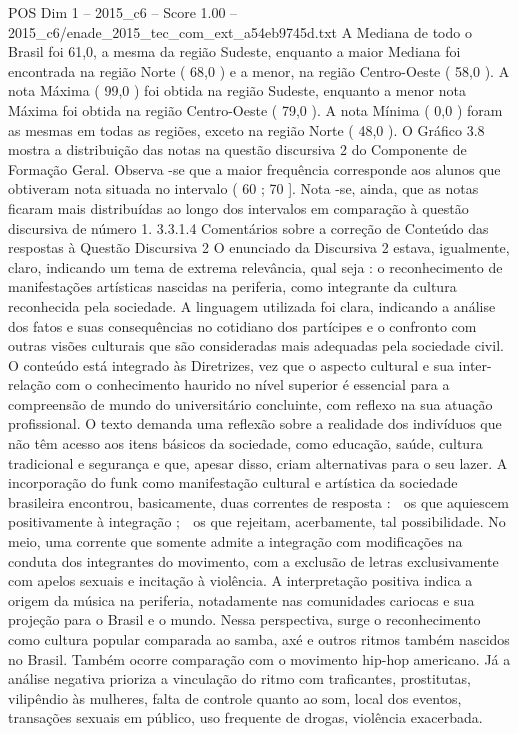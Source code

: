 \begin{textsample}{POS Dim 1 – 2015\_c6 – Score 1.00 – 2015\_c6/enade\_2015\_tec\_com\_ext\_a54eb9745d.txt}
A Mediana de todo o Brasil foi 61,0, a mesma da região Sudeste, enquanto a maior Mediana foi encontrada na região Norte ( 68,0 ) e a menor, na região Centro-Oeste ( 58,0 ).
A nota Máxima ( 99,0 ) foi obtida na região Sudeste, enquanto a menor nota Máxima foi obtida na região Centro-Oeste ( 79,0 ).
A nota Mínima ( 0,0 ) foram as mesmas em todas as regiões, exceto na região Norte ( 48,0 ).
O Gráfico 3.8 mostra a distribuição das notas na questão discursiva 2 do Componente de Formação Geral.
Observa -se que a maior frequência corresponde aos alunos que obtiveram nota situada no intervalo ( 60 ; 70 ].
Nota -se, ainda, que as notas ficaram mais distribuídas ao longo dos intervalos em comparação à questão discursiva de número 1. 3.3.1.4 Comentários sobre a correção de Conteúdo das respostas à Questão Discursiva 2 O enunciado da Discursiva 2 estava, igualmente, claro, indicando um tema de extrema relevância, qual seja : o reconhecimento de manifestações artísticas nascidas na periferia, como integrante da cultura reconhecida pela sociedade.
A linguagem utilizada foi clara, indicando a análise dos fatos e suas consequências no cotidiano dos partícipes e o confronto com outras visões culturais que são consideradas mais adequadas pela sociedade civil.
O conteúdo está integrado às Diretrizes, vez que o aspecto cultural e sua inter-relação com o conhecimento haurido no nível superior é essencial para a compreensão de mundo do universitário concluinte, com reflexo na sua atuação profissional.
O texto demanda uma reflexão sobre a realidade dos indivíduos que não têm acesso aos itens básicos da sociedade, como educação, saúde, cultura tradicional e segurança e que, apesar disso, criam alternativas para o seu lazer.
A incorporação do funk como manifestação cultural e artística da sociedade brasileira encontrou, basicamente, duas correntes de resposta :  os que aquiescem positivamente à integração ;  os que rejeitam, acerbamente, tal possibilidade.
No meio, uma corrente que somente admite a integração com modificações na conduta dos integrantes do movimento, com a exclusão de letras exclusivamente com apelos sexuais e incitação à violência.
A interpretação positiva indica a origem da música na periferia, notadamente nas comunidades cariocas e sua projeção para o Brasil e o mundo.
Nessa perspectiva, surge o reconhecimento como cultura popular comparada ao samba, axé e outros ritmos também nascidos no Brasil.
Também ocorre comparação com o movimento hip-hop americano.
Já a análise negativa prioriza a vinculação do ritmo com traficantes, prostitutas, vilipêndio às mulheres, falta de controle quanto ao som, local dos eventos, transações sexuais em público, uso frequente de drogas, violência exacerbada.

\end{textsample}
